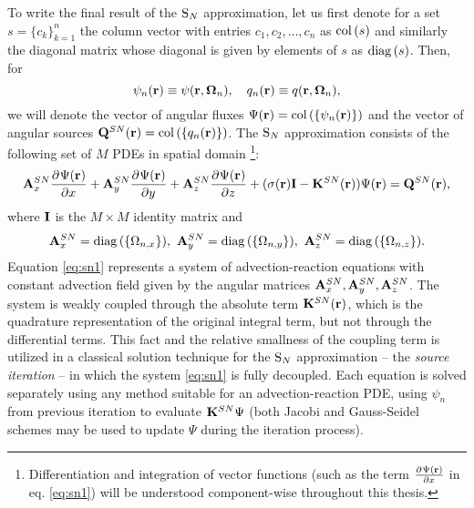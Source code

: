 To write  the final result of the $\text{S}_{N}$ approximation, let us first denote for a set $s = \{c_k\}_{k=1}^n$ the column
vector with entries $c_1,c_2,\ldots,c_n$ as $\operatorname{col\,}(s)$ and similarly the diagonal matrix whose diagonal is
given by elements of $s$ as $\operatorname{diag\,}(s)$. Then, for
 $$\psi_n(\mathbf{r}) \equiv \psi(\mathbf{r},\mathbf{\Omega}_n), \quad q_n(\mathbf{r}) \equiv
q(\mathbf{r},\mathbf{\Omega}_n),$$ we will denote the vector of angular fluxes $\Psi(\mathbf{r}) = \operatorname{col\,}(\{\psi_n(\mathbf{r})\})$ and the vector of
angular sources $\mathbf{Q}^{SN}(\mathbf{r}) = \operatorname{col\,}(\{q_n(\mathbf{r})\})$.
The $\text{S}_{N}$ approximation consists of the following set of $M$ PDEs in spatial domain \footnote{Differentiation and
integration of vector functions (such as the term $\frac{\partial^{}\Psi(\mathbf{r})}{\partial x^{}}$ in eq. \eqref{eq:sn1}) will be understood
component-wise throughout this thesis.}:
\begin{equation}\label{eq:sn1} 
\mathbf{A}^{SN}_x\frac{\partial^{}\Psi(\mathbf{r})}{\partial x^{}} + \mathbf{A}^{SN}_y\frac{\partial^{}\Psi(\mathbf{r})}{\partial y^{}} +
\mathbf{A}^{SN}_z\frac{\partial^{}\Psi(\mathbf{r})}{\partial z^{}} + (\sigma(\mathbf{r})\mathbf{I} - \mathbf{K}^{SN}(\mathbf{r}))\Psi(\mathbf{r}) = \mathbf{Q}^{SN}(\mathbf{r}),
\end{equation}
where $\mathbf{I}$ is the $M\times M$ identity matrix and
$$
	\mat{A}^{SN}_x = \diag(\{\Omega_{n,x}\}),\ \mat{A}^{SN}_y = \diag(\{\Omega_{n,y}\}),\ \mat{A}^{SN}_z =
	\diag(\{\Omega_{n,z}\}).
$$
Equation
\eqref{eq:sn1} represents a system of advection-reaction equations with constant advection field given by the angular 
matrices $\mathbf{A}^{SN}_x, \mathbf{A}^{SN}_y, \mathbf{A}^{SN}_z$. The system is weakly coupled through the absolute term
$\mathbf{K}^{SN}(\mathbf{r})$, which is the quadrature representation of the original integral term, but not through the
differential terms. This fact and the relative smallness of the coupling term is utilized in a classical solution
technique for the $\text{S}_{N}$ approximation -- the \textit{source iteration} -- in which the system \eqref{eq:sn1} is fully
decoupled. Each equation is solved separately using any method suitable for an advection-reaction PDE, using $\psi_n$
from previous iteration to evaluate $\mathbf{K}^{SN}\Psi$ (both Jacobi and Gauss-Seidel schemes may be used to update
$\Psi$ during the iteration process).

